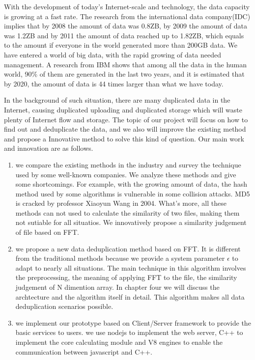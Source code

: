 \begin{englishabstract}

    With the development of today's Internet-scale and technology, the data capacity is growing at a fast rate. The research from the international data company(IDC) implies that by 2008 the amount of data was 0.8ZB, by 2009 the amount of data was 1.2ZB and by 2011 the amount of data reached up to 1.82ZB, which equals to the amount if everyone in the world generated more than 200GB data. We have entered a world of big data, with the rapid growing of data needed management. A research from IBM shows that among all the data in the human world, 90\% of them are generated in the last two years, and it is estimated that by 2020, the amount of data is 44 times larger than what we have today.

    In the background of such situation, there are many duplicated data in the Internet, causing duplicated uploading and duplicated storage which will waste plenty of Internet flow and storage. The topic of our project will focus on how to find out and deduplicate the data, and we also will improve the existing method and propose a Innovative method to solve this kind of question. Our main work and innovation are as follows.

\begin{enumerate}
    \item we compare the existing methods in the industry and survey the technique used by some well-known companies. We analyze these methods and give some shortcomings. For example, with the growing amount of data, the hash method used by some algorithms is vulnerable in some collision attacks. MD5 is cracked by professor Xiaoyun Wang in 2004. What's more, all these methods can not used to calculate the similarity of two files, making them not sutiable for all situatios. We innovatively propose a similarity judgement of file based on FFT.

    \item we propose a new data deduplication method based on FFT. It is different from the traditional methods because we provide a system parameter $\epsilon$ to adapt to nearly all situations. The main technique in this algorithm involves the preprocessing, the meaning of applying FFT to the file, the similarity judgement of N dimention array. In chapter four we will discuss the archtecture and the algorithm itself in detail. This algorithm makes all data deduplication scenarios possible.

    \item we implement our prototype based on Client/Server framework to provide the basic services to users. we use nodejs to implement the web server, C++ to implement the core calculating module and V8 engines to enable the communication between javascript and C++.
\end{enumerate}

\end{englishabstract}
